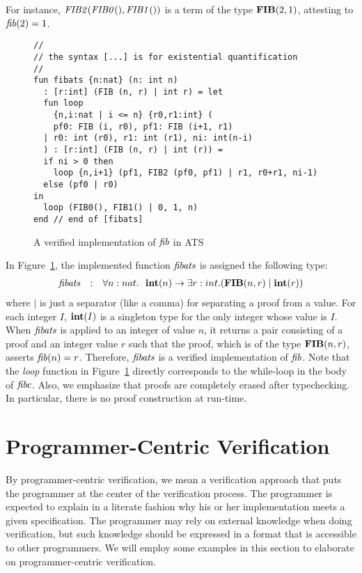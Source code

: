 \documentclass{llncs}
\begin{document}
For instance, ${\it FIB2}({\it FIB0}(), {\it FIB1}())$ is a term of the type
${\bf FIB}(2,1)$, attesting to ${\it fib}(2)=1$.
\begin{figure}
\begin{verbatim}
//
// the syntax [...] is for existential quantification
//
fun fibats {n:nat} (n: int n)
  : [r:int] (FIB (n, r) | int r) = let
  fun loop
    {n,i:nat | i <= n} {r0,r1:int} (
    pf0: FIB (i, r0), pf1: FIB (i+1, r1)
  | r0: int (r0), r1: int (r1), ni: int(n-i)
  ) : [r:int] (FIB (n, r) | int (r)) =
  if ni > 0 then
    loop {n,i+1} (pf1, FIB2 (pf0, pf1) | r1, r0+r1, ni-1)
  else (pf0 | r0)
in
  loop (FIB0(), FIB1() | 0, 1, n)
end // end of [fibats]
\end{verbatim}
\caption{A verified implementation of ${\it fib}$ in ATS}
\label{figure:fibats}
\end{figure}
In Figure~\ref{figure:fibats}, the implemented function ${\it fibats}$ is
assigned the following type:
\[\begin{array}{rcl}
{\it fibats} &:& \forall n:nat.~~{\bf int}(n)\rightarrow\exists r:int.({\bf FIB}(n,r)\mid{\bf int}(r))
\end{array}\]
where $\mid$ is just a separator (like a comma) for separating a proof from
a value.  For each integer $I$, ${\bf int}(I)$ is a singleton type for the only
integer whose value is $I$. When ${\it fibats}$ is applied to an integer of
value $n$, it returns a pair consisting of a proof and an integer value $r$
such that the proof, which is of the type ${\bf FIB}(n,r)$, asserts ${\it fib}(n)=r$.
Therefore, ${\it fibats}$ is a verified implementation of ${\it fib}$. Note that the
{\it loop} function in Figure~\ref{figure:fibats} directly corresponds to
the while-loop in the body of ${\it fibc}$.  Also, we emphasize that proofs are
completely erased after typechecking. In particular, there is no proof
construction at run-time.

\def\inil{{\it nil}}
\def\icons{{\it cons}}
\def\silist{{\it ilist}}
\def\tintlist{{\it intlist}}
\section{Programmer-Centric Verification}\label{section:PCV}
By programmer-centric verification, we mean a verification approach that
puts the programmer at the center of the verification process.  The
programmer is expected to explain in a literate fashion why his or her
implementation meets a given specification. The programmer may rely on
external knowledge when doing verification, but such knowledge should be
expressed in a format that is accessible to other programmers.  We will
employ some examples in this section to elaborate on programmer-centric
verification.
\end{document}
